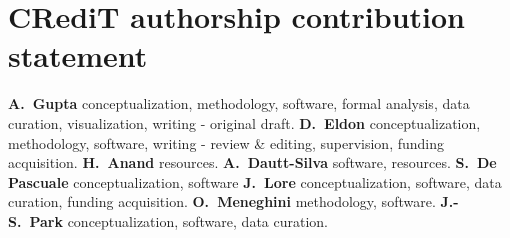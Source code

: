 \section*{CRediT authorship contribution statement}

\textbf{A.~Gupta} conceptualization,  methodology, software, formal analysis, data curation, visualization, writing - original draft.
\textbf{D.~Eldon} conceptualization, methodology, software, writing - review \& editing, supervision, funding acquisition.
\textbf{H.~Anand} resources.
\textbf{A.~Dautt-Silva} software, resources.
\textbf{S.~De Pascuale} conceptualization, software
\textbf{J.~Lore} conceptualization, software, data curation, funding acquisition.
\textbf{O.~Meneghini} methodology, software.
\textbf{J.-S.~Park} conceptualization, software, data curation.